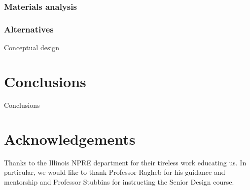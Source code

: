 \documentclass[12pt]{article}
\begin{document}
\subsubsection{Materials analysis}
\subsubsection{Alternatives}
Conceptual design
\section{Conclusions}
Conclusions


\section{Acknowledgements}
Thanks to the Illinois NPRE department for their tireless work educating us. In particular, we would like to thank Professor Ragheb for his guidance and mentorship and Professor Stubbins for instructing the Senior Design course.



\end{document}
